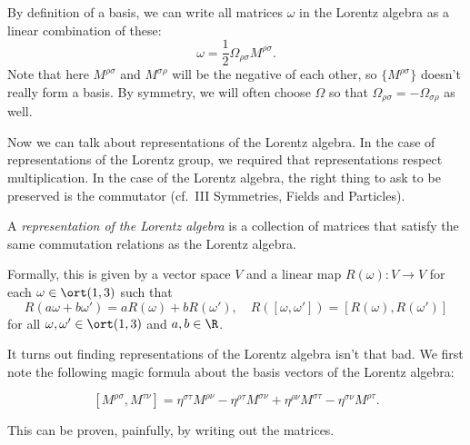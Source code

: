 \documentclass[a4paper]{article}
\begin{document}
By definition of a basis, we can write all matrices $\omega$ in the Lorentz algebra as a linear combination of these:
\[
  \omega = \frac{1}{2} \Omega_{\rho\sigma}M^{\rho\sigma}.
\]
Note that here $M^{\rho\sigma}$ and $M^{\sigma\rho}$ will be the negative of each other, so $\{M^{\rho\sigma}\}$ doesn't really form a basis. By symmetry, we will often choose $\Omega$ so that $\Omega_{\rho\sigma} = - \Omega_{\sigma \rho}$ as well.

Now we can talk about representations of the Lorentz algebra. In the case of representations of the Lorentz group, we required that representations respect multiplication. In the case of the Lorentz algebra, the right thing to ask to be preserved is the commutator (cf.\ III Symmetries, Fields and Particles).
\begin{defi}
  A \emph{representation of the Lorentz algebra} is a collection of matrices that satisfy the same commutation relations as the Lorentz algebra.

  Formally, this is given by a vector space $V$ and a linear map $R(\omega): V \to V$ for each $\omega \in \ort(1, 3)$ such that
  \[
    R(a \omega + b\omega') = aR(\omega) + bR(\omega'),\quad R([\omega, \omega']) = [R(\omega), R(\omega')]
  \]
  for all $\omega, \omega' \in \ort(1, 3)$ and $a, b \in \R$.

\end{defi}
It turns out finding representations of the Lorentz algebra isn't that bad. We first note the following magic formula about the basis vectors of the Lorentz algebra:
\begin{prop}
  \[
    [M^{\rho\sigma}, M^{\tau\nu}] = \eta^{\sigma\tau} M^{\rho\nu} - \eta^{\rho\tau} M^{\sigma\nu} + \eta^{\rho\nu}M^{\sigma\tau} - \eta^{\sigma\nu}M^{\rho\tau}.
  \]
\end{prop}
This can be proven, painfully, by writing out the matrices.
\end{document}
